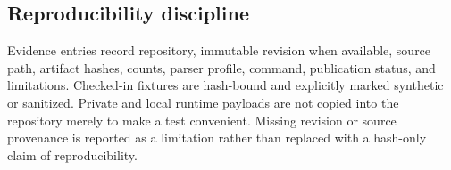 \subsection{Reproducibility discipline}

Evidence entries record repository, immutable revision when available, source
path, artifact hashes, counts, parser profile, command, publication status, and
limitations.  Checked-in fixtures are hash-bound and explicitly marked
synthetic or sanitized.  Private and local runtime payloads are not copied into
the repository merely to make a test convenient.  Missing revision or source
provenance is reported as a limitation rather than replaced with a hash-only
claim of reproducibility.
